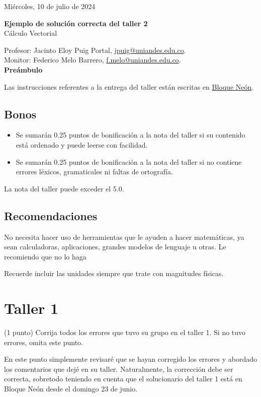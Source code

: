 \documentclass{fmbvecto}
\renewcommand{\title}{Ejemplo de solución correcta del taller 2}
\newcommand{\subject}{Cálculo Vectorial}
\begin{document}
Miércoles, 10 de julio de 2024

\begin{center}
    \textbf{\LARGE \title} \\
    {\large \subject}
\end{center}


Profesor: Jacinto Eloy Puig Portal, \href{mailto:jpuig@uniandes.edu.co}{jpuig@uniandes.edu.co}. \\
Monitor: Federico Melo Barrero, \href{mailto:f.melo@uniandes.edu.co}{f.melo@uniandes.edu.co}.\\

\textbf{\Large Preámbulo}

Las instrucciones referentes a la entrega del taller están escritas en \href{https://bloqueneon.uniandes.edu.co/d2l/home}{Bloque Neón}.

\subsection*{Bonos}
\begin{itemize}
  \item Se sumarán 0.25 puntos de bonificación a la nota del taller si su contenido está ordenado y puede leerse con facilidad.
  \item Se sumarán 0.25 puntos de bonificación a la nota del taller si no contiene errores léxicos, gramaticales ni faltas de ortografía.
\end{itemize}
La nota del taller puede exceder el 5.0.

\subsection*{Recomendaciones}

No necesita hacer uso de herramientas que le ayuden a hacer matemáticas, ya sean calculadoras, aplicaciones, grandes modelos de lenguaje u otras. Le recomiendo que no lo haga

Recuerde incluir las unidades siempre que trate con magnitudes físicas.

\section{Taller 1}

\begin{problema}
    
    (1 punto) Corrija todos los errores que tuvo su grupo en el taller 1. Si no tuvo errores, omita este punto.

    \tcblower
    
    En este punto simplemente revisaré que se hayan corregido los errores y abordado los comentarios que dejé en su taller. Naturalmente, la corrección debe ser correcta, sobretodo teniendo en cuenta que el solucionario del taller 1 está en Bloque Neón desde el domingo 23 de junio.

\end{problema}
\end{document}
